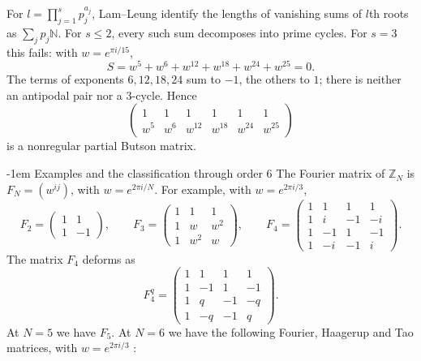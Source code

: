 \documentclass[11pt,a4paper]{article}
\makeatletter
\theoremstyle{plain}
\theoremstyle{definition}
\numberwithin{equation}{section}
\renewcommand\subsection{\@startsection{subsection}{2}{\z@}  {\medskipamount}  {-1em}  {\normalfont\normalsize\bfseries}}
\makeatother
\begin{document}
For $l=\prod_{j=1}^s p_j^{a_j}$, Lam--Leung \cite{lle} identify the lengths of vanishing sums of $l$th roots as $\sum_jp_j\mathbb N$. For $s\leq2$, every such sum decomposes into prime cycles. For $s=3$ this fails: with $w=e^{\pi i/15}$,
$$S=w^5+w^6+w^{12}+w^{18}+w^{24}+w^{25}=0.$$
The terms of exponents $6,12,18,24$ sum to $-1$, the others to $1$; there is neither an antipodal pair nor a $3$-cycle. Hence
$$\begin{pmatrix}
1&1&1&1&1&1\\
w^5&w^6&w^{12}&w^{18}&w^{24}&w^{25}
\end{pmatrix}$$
is a nonregular partial Butson matrix.

\subsection{Examples and the classification through order 6}\label{bg:examples}\label{bg:smallorders}
The Fourier matrix of $\mathbb Z_N$ is $F_N=(w^{ij})$, with $w=e^{2\pi i/N}$. For example, with $w=e^{2\pi i/3}$,
{\setlength{\arraycolsep}{3.5pt}
$$F_2=\begin{pmatrix}1&1\\1&-1\end{pmatrix},\qquad F_3=\begin{pmatrix}1&1&1\\1&w&w^2\\1&w^2&w\end{pmatrix},\qquad F_4=\begin{pmatrix}
1&1&1&1\\
1&i&-1&-i\\
1&-1&1&-1\\
1&-i&-1&i
\end{pmatrix}.$$
}
The matrix $F_4$ deforms as
$$F_4^q=\begin{pmatrix}
1&1&1&1\\
1&-1&1&-1\\
1&q&-1&-q\\
1&-q&-1&q
\end{pmatrix}.$$
At $N=5$ we have $F_5$. At $N=6$ we have the following Fourier, Haagerup and Tao matrices, with $w=e^{2\pi i/3}$ \cite{bbs,dit,ha1,tao}:
\end{document}
